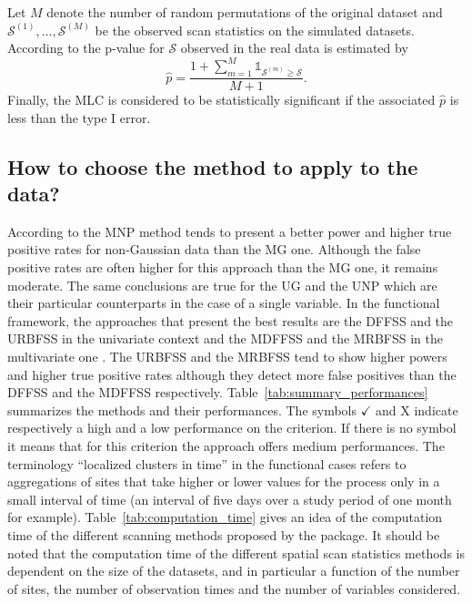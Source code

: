 \noindent Let $M$ denote the number of random permutations of the original dataset and $\mathcal{S}^{(1)},\dots,\mathcal{S}^{(M)}$ be the observed scan statistics on the simulated datasets. According to \citet{dwass} the p-value for $\mathcal{S}$ observed in the real data is estimated by 
\begin{equation}
\hat{p} = \dfrac{1 + \sum_{m=1}^M \mathds{1}_{\mathcal{S}^{(m)} \ge \mathcal{S}}}{M+1}.
\end{equation}
Finally, the MLC is considered to be statistically significant if the associated $\hat{p}$ is less than the type I error. \\


\subsection{How to choose the method to apply to the data?}


According to \citet{nonparam_multi} the MNP method tends to present a better power and higher true positive rates for non-Gaussian data than the MG one. Although the false positive rates are often higher for this approach than the MG one, it remains moderate. The same conclusions are true for the UG \citep{normalkulldorff} and the UNP \citep{A_nonparametric_spatial} which are their particular counterparts in the case of a single variable. In the functional framework, the approaches that present the best results are the DFFSS and the URBFSS in the univariate context and the MDFFSS and the MRBFSS in the multivariate one \citep{notre_fonctionnel, notre_fonctionnel1}. The URBFSS and the MRBFSS tend to show higher powers and higher true positive rates although they detect more false positives than the DFFSS and the MDFFSS respectively. Table~\ref{tab:summary_performances} summarizes the methods and their performances. The symbols $\checkmark$ and \textsf{X} indicate respectively a high and a low performance on the criterion. If there is no symbol it means that for this criterion the approach offers medium performances. The terminology ``localized clusters in time'' in the functional cases refers to aggregations of sites that take higher or lower values for the process only in a small interval of time (an interval of five days over a study period of one month for example). Table~\ref{tab:computation_time} gives an idea of the computation time of the different scanning methods proposed by the package. It should be noted that the computation time of the different spatial scan statistics methods is dependent on the size of the datasets, and in particular a function of the number of sites, the number of observation times and the number of variables considered.


